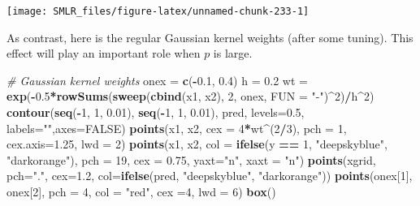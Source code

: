 \documentclass[
]{book}
\newenvironment{Shaded}{\begin{snugshade}}{\end{snugshade}}
\newcommand{\AttributeTok}[1]{\textcolor[rgb]{0.13,0.29,0.53}{#1}}
\newcommand{\CommentTok}[1]{\textcolor[rgb]{0.56,0.35,0.01}{\textit{#1}}}
\newcommand{\ConstantTok}[1]{\textcolor[rgb]{0.56,0.35,0.01}{#1}}
\newcommand{\DecValTok}[1]{\textcolor[rgb]{0.00,0.00,0.81}{#1}}
\newcommand{\FloatTok}[1]{\textcolor[rgb]{0.00,0.00,0.81}{#1}}
\newcommand{\FunctionTok}[1]{\textcolor[rgb]{0.13,0.29,0.53}{\textbf{#1}}}
\newcommand{\NormalTok}[1]{#1}
\newcommand{\OtherTok}[1]{\textcolor[rgb]{0.56,0.35,0.01}{#1}}
\newcommand{\SpecialCharTok}[1]{\textcolor[rgb]{0.81,0.36,0.00}{\textbf{#1}}}
\newcommand{\StringTok}[1]{\textcolor[rgb]{0.31,0.60,0.02}{#1}}
\theoremstyle{definition}
\theoremstyle{definition}
\theoremstyle{definition}
\theoremstyle{definition}
\theoremstyle{remark}
\begin{document}
\begin{center}\texttt{[image: SMLR\_files/figure-latex/unnamed-chunk-233-1]} \end{center}

As contrast, here is the regular Gaussian kernel weights (after some tuning). This effect will play an important role when \(p\) is large.

\begin{Shaded}
\begin{Highlighting}[]
  \CommentTok{\# Gaussian kernel weights}
\NormalTok{  onex }\OtherTok{=} \FunctionTok{c}\NormalTok{(}\SpecialCharTok{{-}}\FloatTok{0.1}\NormalTok{, }\FloatTok{0.4}\NormalTok{)}
\NormalTok{  h }\OtherTok{=} \FloatTok{0.2}
\NormalTok{  wt }\OtherTok{=} \FunctionTok{exp}\NormalTok{(}\SpecialCharTok{{-}}\FloatTok{0.5}\SpecialCharTok{*}\FunctionTok{rowSums}\NormalTok{(}\FunctionTok{sweep}\NormalTok{(}\FunctionTok{cbind}\NormalTok{(x1, x2), }\DecValTok{2}\NormalTok{, onex, }\AttributeTok{FUN =} \StringTok{"{-}"}\NormalTok{)}\SpecialCharTok{\^{}}\DecValTok{2}\NormalTok{)}\SpecialCharTok{/}\NormalTok{h}\SpecialCharTok{\^{}}\DecValTok{2}\NormalTok{)}
  \FunctionTok{contour}\NormalTok{(}\FunctionTok{seq}\NormalTok{(}\SpecialCharTok{{-}}\DecValTok{1}\NormalTok{, }\DecValTok{1}\NormalTok{, }\FloatTok{0.01}\NormalTok{), }\FunctionTok{seq}\NormalTok{(}\SpecialCharTok{{-}}\DecValTok{1}\NormalTok{, }\DecValTok{1}\NormalTok{, }\FloatTok{0.01}\NormalTok{), pred, }
          \AttributeTok{levels=}\FloatTok{0.5}\NormalTok{, }\AttributeTok{labels=}\StringTok{""}\NormalTok{,}\AttributeTok{axes=}\ConstantTok{FALSE}\NormalTok{)}
  \FunctionTok{points}\NormalTok{(x1, x2, }\AttributeTok{cex =} \DecValTok{4}\SpecialCharTok{*}\NormalTok{wt}\SpecialCharTok{\^{}}\NormalTok{(}\DecValTok{2}\SpecialCharTok{/}\DecValTok{3}\NormalTok{), }\AttributeTok{pch =} \DecValTok{1}\NormalTok{, }\AttributeTok{cex.axis=}\FloatTok{1.25}\NormalTok{, }\AttributeTok{lwd =} \DecValTok{2}\NormalTok{)}
  \FunctionTok{points}\NormalTok{(x1, x2, }\AttributeTok{col =} \FunctionTok{ifelse}\NormalTok{(y }\SpecialCharTok{==} \DecValTok{1}\NormalTok{, }\StringTok{"deepskyblue"}\NormalTok{, }\StringTok{"darkorange"}\NormalTok{), }
         \AttributeTok{pch =} \DecValTok{19}\NormalTok{, }\AttributeTok{cex =} \FloatTok{0.75}\NormalTok{, }\AttributeTok{yaxt=}\StringTok{"n"}\NormalTok{, }\AttributeTok{xaxt =} \StringTok{"n"}\NormalTok{)}
  \FunctionTok{points}\NormalTok{(xgrid, }\AttributeTok{pch=}\StringTok{"."}\NormalTok{, }\AttributeTok{cex=}\FloatTok{1.2}\NormalTok{, }
         \AttributeTok{col=}\FunctionTok{ifelse}\NormalTok{(pred, }\StringTok{"deepskyblue"}\NormalTok{, }\StringTok{"darkorange"}\NormalTok{))}
  \FunctionTok{points}\NormalTok{(onex[}\DecValTok{1}\NormalTok{], onex[}\DecValTok{2}\NormalTok{], }\AttributeTok{pch =} \DecValTok{4}\NormalTok{, }\AttributeTok{col =} \StringTok{"red"}\NormalTok{, }\AttributeTok{cex =}\DecValTok{4}\NormalTok{, }\AttributeTok{lwd =} \DecValTok{6}\NormalTok{)}
  \FunctionTok{box}\NormalTok{()}
\end{Highlighting}
\end{Shaded}
\end{document}
